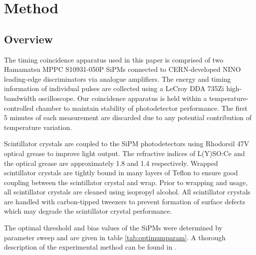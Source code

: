 \section{Method}
\label{sec:method}
\subsection{Overview}
The timing coincidence apparatus used in this paper is comprised of two Hamamatsu MPPC S10931-050P SiPMs connected to CERN-developed NINO leading-edge discriminators via analogue amplifiers. The energy and timing information of individual pulses are collected using a LeCroy DDA 735Zi high-bandwidth oscilloscope. Our coincidence apparatus is held within a temperature-controlled chamber to maintain stability of photodetector performance. The first 5 minutes of each measurement are discarded due to any potential contribution of temperature variation.

Scintillator crystals are coupled to the SiPM photodetectors using Rhodorsil 47V optical grease to improve light output. The refractive indices of L(Y)SO:Ce and the optical grease are approximately 1.8 \cite{Erdei2012} and 1.4 \cite{rhodorsilgrease} respectively. Wrapped scintillator crystals are tightly bound in many layers of Teflon to ensure good coupling between the scintillator crystal and wrap. Prior to wrapping and usage, all scintillator crystals are cleaned using isopropyl alcohol. All scintillator crystals are handled with carbon-tipped tweezers to prevent formation of surface defects which may degrade the scintillator crystal performance. 

The optimal threshold and bias values of the SiPMs were determined by parameter sweep and are given in table \ref{tab:optimumparam}. A thorough description of the experimental method can be found in \cite{ch_Meyer_Pizzichemi_Lecoq_2013}.
